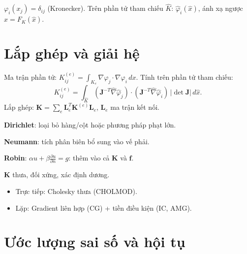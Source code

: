 \documentclass[12pt,a4paper]{article}
\begin{document}
\begin{dinhnghia}[title={Hàm dạng (Shape functions)}]
  $\varphi_i(x_j) = \delta_{ij}$ (Kronecker). Trên phần tử tham chiếu $\hat{K}$: $\hat{\varphi}_i(\hat{x})$, ánh xạ ngược $x = F_K(\hat{x})$.
\end{dinhnghia}

\section{Lắp ghép và giải hệ}

\begin{phuongphap}[title={Lắp ghép (Assembly)}]
  Ma trận phần tử: $K_{ij}^{(e)} = \int_{K_e}\nabla\varphi_j\cdot\nabla\varphi_i\,dx$. Tính trên phần tử tham chiếu:
  \[
    K_{ij}^{(e)} = \int_{\hat{K}} (\mathbf{J}^{-T}\hat{\nabla}\hat{\varphi}_j)\cdot(\mathbf{J}^{-T}\hat{\nabla}\hat{\varphi}_i)\,|\det\mathbf{J}|\,d\hat{x}.
  \]
  Lắp ghép: $\mathbf{K} = \sum_e \mathbf{L}_e^T\mathbf{K}^{(e)}\mathbf{L}_e$, $\mathbf{L}_e$ ma trận kết nối.
\end{phuongphap}

\begin{phuongphap}[title={Áp điều kiện biên}]
  \textbf{Dirichlet}: loại bỏ hàng/cột hoặc phương pháp phạt lớn.

  \textbf{Neumann}: tích phân biên bổ sung vào vế phải.

  \textbf{Robin}: $\alpha u + \beta\frac{\partial u}{\partial n} = g$: thêm vào cả $\mathbf{K}$ và $\mathbf{f}$.
\end{phuongphap}

\begin{phuongphap}[title={Giải hệ $\mathbf{K}\mathbf{u} = \mathbf{f}$}]
  $\mathbf{K}$ thưa, đối xứng, xác định dương.
  \begin{itemize}
    \item Trực tiếp: Cholesky thưa (CHOLMOD).
    \item Lặp: Gradient liên hợp (CG) + tiền điều kiện (IC, AMG).
  \end{itemize}
\end{phuongphap}

\section{Ước lượng sai số và hội tụ}
\end{document}
